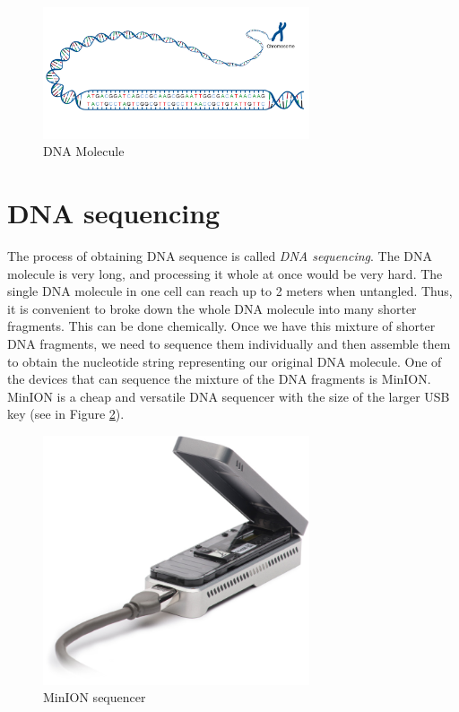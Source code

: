 \begin{figure}
\centerline{\includegraphics[width=0.7\textwidth, height=0.3\textheight]{images/acgt}}
\caption[DNA]{DNA Molecule}
\label{obr:acgt}
\end{figure}

\section{DNA sequencing}
\label{section:dnaSequencing}


The process of obtaining DNA sequence is called \textit{DNA sequencing}.
The DNA molecule is very long, and processing it whole at once would be very hard.
The single DNA molecule in one cell can reach up to 2 meters when untangled.
Thus, it is convenient to broke down the whole DNA molecule into many shorter fragments.
This can be done chemically. Once we have this mixture of shorter DNA fragments, we need to sequence them
individually and then assemble them to obtain the nucleotide string representing
our original DNA molecule. One of the devices that can sequence the mixture of the
DNA fragments is MinION\cite{lu2016oxford}. MinION is a cheap and versatile DNA sequencer
with the size of the larger USB key (see in Figure \ref{obr:minIon}).

\begin{figure}
\centerline{\includegraphics[width=0.7\textwidth, height=0.3\textheight]{images/minion}}
\caption[MinION]{MinION sequencer}
\label{obr:minIon}
\end{figure}

